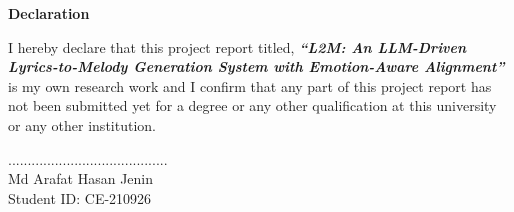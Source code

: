 \begin{titlepage}

\begin{center}

    \LARGE
    \textbf{Declaration\\}

\end{center}

    \vspace{1.5cm}
    \normalsize
    \noindent
    I hereby declare that this project report titled, \textbf{\textit{\enquote{L2M: An LLM-Driven Lyrics-to-Melody Generation System with Emotion-Aware Alignment}}} is my own research work and I confirm that any part of this project report has not been submitted yet for a degree or any other qualification at this university or any other institution.

    \vspace{9cm}

\begin{flushright}
        .........................................\\
         Md Arafat Hasan Jenin \\ Student ID: CE-210926


\end{flushright}



\end{titlepage}
